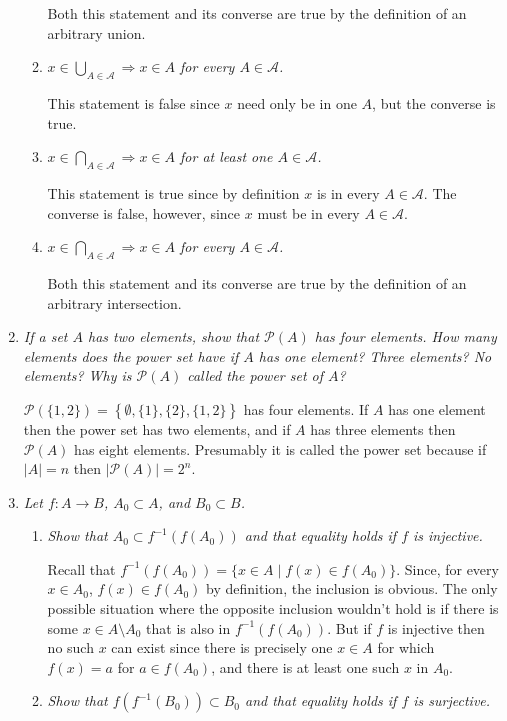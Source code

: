 \documentclass[letterpaper, 11pt]{article}
\newcommand{\powset}[1]{
\mathcal{P}\left(#1\right)
}
\begin{document}
\begin{enumerate}
\begin{enumerate}
Both this statement and its converse are true by the definition of an arbitrary union.

\item \emph{$x \in \bigcup_{A \in \mathcal{A}} \Rightarrow x \in A$ for every $A \in \mathcal{A}$.}

This statement is false since $x$ need only be in one $A$, but the converse is true.

\item \emph{$x \in \bigcap_{A \in \mathcal{A}} \Rightarrow x \in A$ for at least one $A \in \mathcal{A}$.}

This statement is true since by definition $x$ is in every $A \in \mathcal{A}$.  The converse is false, however, since $x$ must be in every $A \in \mathcal{A}$.

\item \emph{$x \in \bigcap_{A \in \mathcal{A}} \Rightarrow x \in A$ for every $A \in \mathcal{A}$.}

Both this statement and its converse are true by the definition of an arbitrary intersection.
\end{enumerate}

\item \emph{If a set $A$ has two elements, show that $\powset{A}$ has four elements.  How many elements does the power set have if $A$ has one element?  Three elements?  No elements?  Why is $\powset{A}$ called the power set of $A$?}

$\powset{\{1,2\}} = \left\{\emptyset, \{1\}, \{2\}, \{1,2\}\right\}$ has four elements.  If $A$ has one element then the power set has two elements, and if $A$ has three elements then $\powset{A}$ has eight elements.  Presumably it is called the power set because if $|A|=n$ then $\left|\powset{A}\right| = 2^n$.

\item \emph{Let $f: A \rightarrow B$, $A_0 \subset A$, and $B_0 \subset B$.}
\begin{enumerate}
\item \emph{Show that $A_0 \subset f^{-1}(f(A_0))$ and that equality holds if $f$ is injective.}

Recall that $f^{-1}(f(A_0)) = \{x \in A \mid f(x) \in f(A_0)\}$.  Since, for every $x \in A_0$, $f(x) \in f(A_0)$ by definition, the inclusion is obvious.  The only possible situation where the opposite inclusion wouldn't hold is if there is some $x \in A \setminus A_0$ that is also in $f^{-1}(f(A_0))$.  But if $f$ is injective then no such $x$ can exist since there is precisely one $x \in A$ for which $f(x) = a$ for $a \in f(A_0)$, and there is at least one such $x$ in $A_0$.
\item \emph{Show that $f(f^{-1}(B_0)) \subset B_0$ and that equality holds if $f$ is surjective.}


\end{enumerate}
\end{enumerate}
\end{document}

